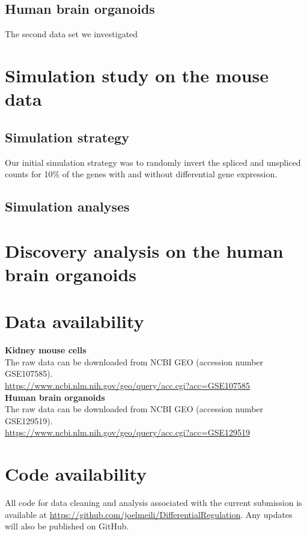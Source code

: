 \subsection{Human brain organoids}
The second data set we investigated


\citep{brain_organoids}

\section{Simulation study on the mouse data}

\subsection{Simulation strategy}
Our initial simulation strategy was to randomly invert the spliced and unspliced counts for 10\% of the genes with and without differential gene expression. 

\subsection{Simulation analyses}

\section{Discovery analysis on the human brain organoids}

\section{Data availability}

\noindent\textbf{Kidney mouse cells} \\
The raw data can be downloaded from NCBI GEO (accession number GSE107585). \\ 
\url{https://www.ncbi.nlm.nih.gov/geo/query/acc.cgi?acc=GSE107585} \\

\noindent\textbf{Human brain organoids} \\
The raw data can be downloaded from NCBI GEO (accession number GSE129519). \\
\url{https://www.ncbi.nlm.nih.gov/geo/query/acc.cgi?acc=GSE129519}

\section{Code availability}
All code for data cleaning and analysis associated with the current submission is available at \url{https://github.com/joelmeili/DifferentialRegulation}. Any updates will also be published on GitHub.
